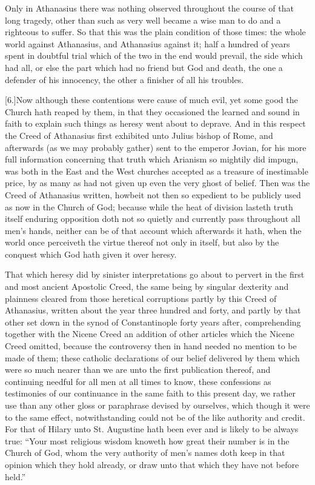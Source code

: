 Only in Athanasius there was nothing observed throughout the course of that long tragedy, other than such as very well became a wise man to do and a righteous to suffer. So that  this was the plain condition of those times:
 the whole world against Athanasius, and Athanasius against it; half a hundred of years spent in doubtful trial which of the two in the end would prevail, the side which had all, or else the part which had no friend but God and death, the one a defender of his innocency, the other a finisher of all his troubles.

[6.]Now although these contentions were cause of much evil, yet some good the Church hath reaped by them, in that they occasioned the learned and sound in faith to explain such things as heresy went about to deprave. And in this respect the Creed of Athanasius first exhibited unto Julius bishop of Rome, and afterwards (as we may probably gather) sent to the emperor Jovian, for his more full information concerning that truth which Arianism so mightily did impugn, was both in the East and the West churches accepted as a treasure of inestimable price, by as many as had not given up even the very ghost of belief. Then was the Creed of Athanasius written, howbeit not then so expedient to be publicly used as now in the Church of God; because while the heat of division lasteth truth itself enduring opposition doth not so quietly and currently pass throughout all men’s hands, neither can be of that account which afterwards it hath, when the world once perceiveth the virtue thereof not only in itself, but also by the conquest which God hath given it over heresy.

That which heresy did by sinister interpretations go about to pervert in the first and most ancient Apostolic Creed, the same being by singular dexterity and plainness cleared from those heretical corruptions partly by this Creed of Athanasius, written about the year three hundred and forty, and partly by that other set down in the synod of Constantinople forty years after, comprehending together with the Nicene Creed an addition of other articles which the Nicene  Creed omitted, because the controversy then in hand needed no mention to be made of them;
 these catholic declarations of our belief delivered by them which were so much nearer than we are unto the first publication thereof, and continuing needful for all men at all times to know, these confessions as testimonies of our continuance in the same faith to this present day, we rather use than any other gloss or paraphrase devised by ourselves, which though it were to the same effect, notwithstanding could not be of the like authority and credit. For that of Hilary unto St. Augustine hath been ever and is likely to be always true: “Your most religious wisdom knoweth how great their number is in the Church of God, whom the very authority of men’s names doth keep in that opinion which they hold already, or draw unto that which they have not before held.”

